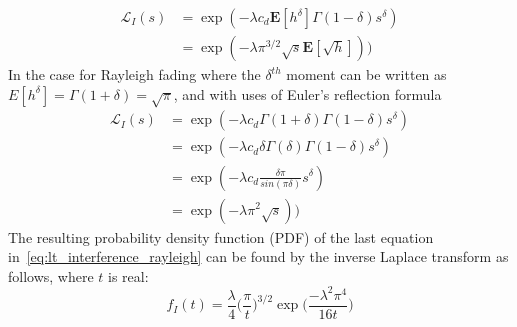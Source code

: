%
\begin{equation}\label{eq:lt_interference_fading}
  \begin{split}
  \mathcal{L}_I(s) &= \exp(-\lambda c_d \textbf{E}[h^\delta] \Gamma(1-\delta)s^\delta) \\
  &= \exp(- \lambda \pi^{3/2} \sqrt{s} \textbf{E}[\sqrt{h}]))
  \end{split}
\end{equation}
%
In the case for Rayleigh fading where the $\delta^{th}$ moment can be written as $E[h^{\delta}]=\Gamma(1+\delta)=\sqrt{\pi}$, and with uses of Euler's reflection formula
%
\begin{equation}\label{eq:lt_interference_rayleigh}
  \begin{split}
  \mathcal{L}_I(s) &= \exp(-\lambda c_d \Gamma(1+\delta) \Gamma(1-\delta)s^\delta) \\
   &= \exp(-\lambda c_d \delta \Gamma(\delta) \Gamma(1-\delta)s^\delta) \\
   &= \exp(-\lambda c_d  \frac{\delta \pi}{sin(\pi \delta)} s^\delta) \\
   &= \exp(- \lambda \pi^{2} \sqrt{s}))
  \end{split}
\end{equation}
%
The resulting probability density function (PDF) of the last equation in~\eqref{eq:lt_interference_rayleigh} can be found by the inverse Laplace transform as follows, where $t$ is real:
%
\begin{equation}\label{eq:lt_interference_rayleigh}
  f_I(t) = \frac{\lambda}{4} \Big( \frac{\pi}{t} \Big)^{3/2} \exp \Big(\frac{-\lambda^2 \pi^4}{16t}\Big)
\end{equation}
%
